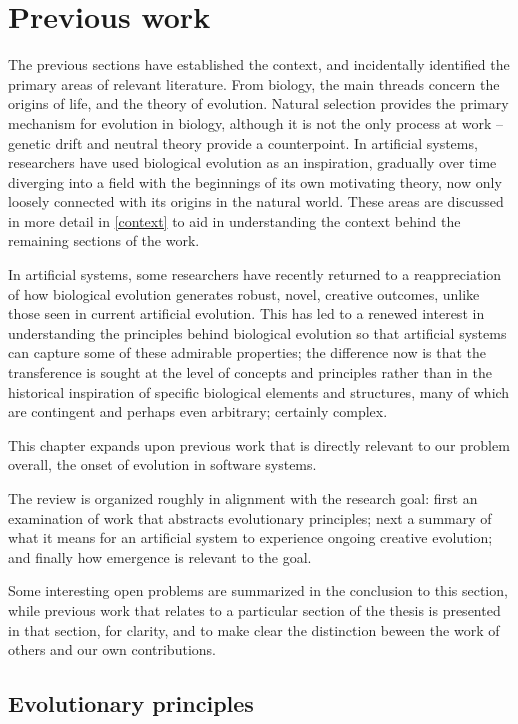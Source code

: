 \documentclass[]{report}
\begin{document}
\section{Previous work}
The previous sections have established the context, and incidentally identified the primary areas of relevant literature. From biology, the main threads concern the origins of life, and the theory of evolution. Natural selection provides the primary mechanism for evolution in biology, although it is not the only process at work -- genetic drift and neutral theory provide a counterpoint. In artificial systems, researchers have used biological evolution as an inspiration, gradually over time diverging into a field with the beginnings of its own motivating theory, now only loosely connected with its origins in the natural world. These areas are discussed in more detail in \ref{context} to aid in understanding the context behind the remaining sections of the work.

In artificial systems, some researchers have recently returned to a reappreciation of how biological evolution generates robust, novel, creative outcomes, unlike those seen in current artificial evolution. This has led to a renewed interest in understanding the principles behind biological evolution so that artificial systems can capture some of these admirable properties; the difference now is that the transference is sought at the level of concepts and principles rather than in the historical inspiration of specific biological elements and structures, many of which are contingent and perhaps even arbitrary; certainly complex.

This chapter expands upon previous work that is directly relevant to our problem overall, the onset of evolution in software systems. 

The review is organized roughly in alignment with the research goal: first an examination of work that abstracts evolutionary principles; next a summary of what it means for an artificial system to experience ongoing creative evolution; and finally how emergence is relevant to the goal.

Some interesting open problems are summarized in the conclusion to this section, while previous work that relates to a particular section of the thesis is presented in that section, for clarity, and to make clear the distinction beween the work of others and our own contributions.

\subsection{Evolutionary principles}
\end{document}
